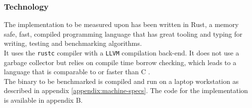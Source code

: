\subsubsection{Technology}
The implementation to be measured upon has been written in Rust, a memory safe, fast, compiled programming language \cite{rust-lang} that has great tooling and typing for writing, testing and benchmarking algorithms.\\
It uses the \texttt{rustc} compiler with a \texttt{LLVM} compilation back-end. It does not use a garbage collector but relies on compile time borrow checking, which leads to a language that is comparable to or faster than C \cite{highleveldrivers}.\\
The binary to be benchmarked is compiled and run on a laptop workstation as described in appendix \ref{appendix:machine-specs}.
The code for the implementation is available in appendix B.
